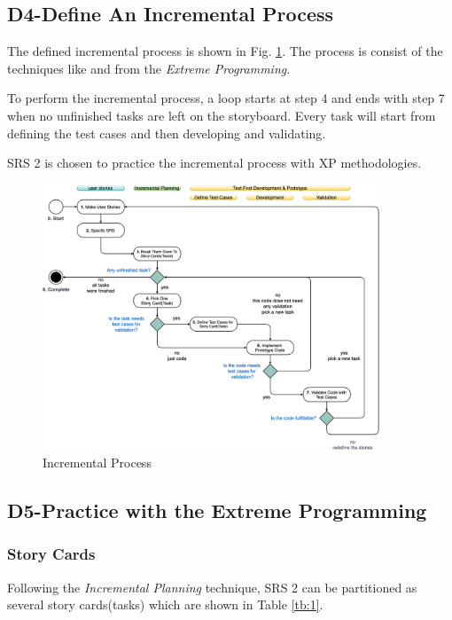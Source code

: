 \documentclass[technote, transmag, onecolumn, 9pt]{IEEEtran}
\begin{document}
\subsection*{\textbf{D4-Define An Incremental Process}}

The defined incremental process is shown in Fig. \ref{fig:incre-process}.
The process is consist of the techniques like  and
 from the \textit{Extreme Programming}.

To perform the incremental process, a loop starts at step 4
and ends with step 7 when no unfinished tasks are left on the storyboard.
Every task will start from defining the test cases and then developing and validating.

SRS 2 is chosen to practice the incremental process with XP methodologies.

\begin{figure}[!ht]
	\centering
	\includegraphics[width=0.9\textwidth]{./img/f7-incremental-process.png}
	\caption{Incremental Process}
	\label{fig:incre-process}
\end{figure}

\subsection*{\textbf{D5-Practice with the Extreme Programming}}

\subsubsection*{\textbf{Story Cards}}

Following the \textit{Incremental Planning} technique,
SRS 2 can be partitioned as several story cards(tasks) which are shown in Table \ref{tb:1}.
\end{document}
